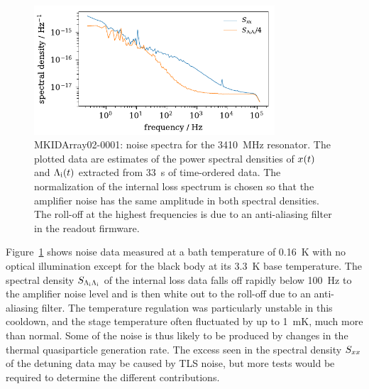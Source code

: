 \begin{figure}[htb]
\centering
\includegraphics[width=0.8\textwidth]{multichroic/mkidarray02_chosen_one_noise_spectra.pdf}
\caption[MKIDArray02-0001: noise spectra for the \SI{3410}{MHz} resonator.]
{
MKIDArray02-0001: noise spectra for the \SI{3410}{MHz} resonator.
The plotted data are estimates of the power spectral densities of $x(t)$ and $\Lambda_{\mathrm{i}}(t)$ extracted from \SI{33}{s} of time-ordered data.
The normalization of the internal loss spectrum is chosen so that the amplifier noise has the same amplitude in both spectral densities.
The roll-off at the highest frequencies is due to an anti-aliasing filter in the readout firmware.
}
\label{fig:mkidarray02_chosen_one_noise_spectra}
\end{figure}

Figure~\ref{fig:mkidarray02_chosen_one_noise_spectra} shows noise data measured at a bath temperature of \SI{0.16}{K} with no optical illumination except for the black body at its \SI{3.3}{K} base temperature.
The spectral density $S_{\Lambda_{\mathrm{i}} \Lambda_{\mathrm{i}}}$ of the internal loss data falls off rapidly below \SI{100}{Hz} to the amplifier noise level and is then white out to the roll-off due to an anti-aliasing filter.
The temperature regulation was particularly unstable in this cooldown, and the stage temperature often fluctuated by up to \SI{1}{mK}, much more than normal.
Some of the noise is thus likely to be produced by changes in the thermal quasiparticle generation rate.
The excess seen in the spectral density $S_{x x}$ of the detuning data may be caused by TLS noise, but more tests would be required to determine the different contributions.

